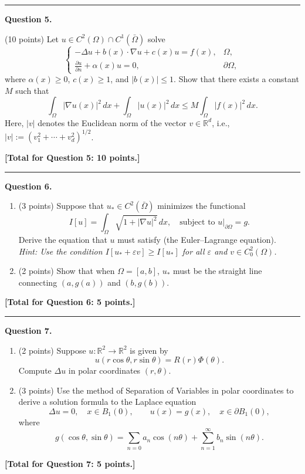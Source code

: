 \documentclass[11pt, a4paper]{article}
\begin{document}
\noindent \rule[0.5pt]{\textwidth}{0.5pt}

\textbf{Question 5.}

(10 points) Let $u \in C^2(\Omega) \cap C^1(\bar{\Omega})$ solve
\[
    \begin{cases}
        -\Delta u + b(x) \cdot \nabla u + c(x)u = f(x), & \Omega,          \\
        \frac{\partial u}{\partial n} + \alpha(x)u = 0, & \partial \Omega,
    \end{cases}
\]
where $\alpha(x) \ge 0$, $c(x) \ge 1$, and $|b(x)| \le 1$. Show that there exists a constant $M$ such that
\[
    \int_{\Omega} |\nabla u(x)|^2 \, dx + \int_{\Omega} |u(x)|^2 \, dx \le M \int_{\Omega} |f(x)|^2 \, dx.
\]
Here, $|v|$ denotes the Euclidean norm of the vector $v \in \mathbb{R}^d$, i.e., $|v| := (v_1^2 + \cdots + v_d^2)^{1/2}$.

\textbf{[Total for Question 5: 10 points.]}

\noindent \rule[0.5pt]{\textwidth}{0.5pt}

\textbf{Question 6.}
\begin{enumerate}[label=(\alph*)]
    \item (3 points) Suppose that $u_* \in C^2(\bar{\Omega})$ minimizes the functional
          \[
              I[u] = \int_{\Omega} \sqrt{1 + |\nabla u|^2} \, dx, \quad \text{subject to } u|_{\partial \Omega} = g.
          \]
          Derive the equation that $u$ must satisfy (the Euler--Lagrange equation). \\
          \textit{Hint: Use the condition $I[u_* + \varepsilon v] \ge I[u_*]$ for all $\varepsilon$ and $v \in C_0^2(\Omega)$.}

    \item (2 points) Show that when $\Omega = [a, b]$, $u_*$ must be the straight line connecting $(a, g(a))$ and $(b, g(b))$.
\end{enumerate}
\textbf{[Total for Question 6: 5 points.]}

\noindent \rule[0.5pt]{\textwidth}{0.5pt}

\textbf{Question 7.}
\begin{enumerate}[label=(\alph*)]
    \item (2 points) Suppose $u : \mathbb{R}^2 \to \mathbb{R}^2$ is given by
          \[
              u(r \cos \theta, r \sin \theta) = R(r)\Phi(\theta).
          \]
          Compute $\Delta u$ in polar coordinates $(r, \theta)$.

    \item (3 points) Use the method of Separation of Variables in polar coordinates to derive a solution formula to the Laplace equation
          \[
              \Delta u = 0, \quad x \in B_1(0), \qquad u(x) = g(x), \quad x \in \partial B_1(0),
          \]
          where
          \[
              g(\cos \theta, \sin \theta) = \sum_{n=0} a_n \cos(n\theta) + \sum_{n=1}^{\infty} b_n \sin(n\theta).
          \]
\end{enumerate}
\textbf{[Total for Question 7: 5 points.]}
\end{document}

